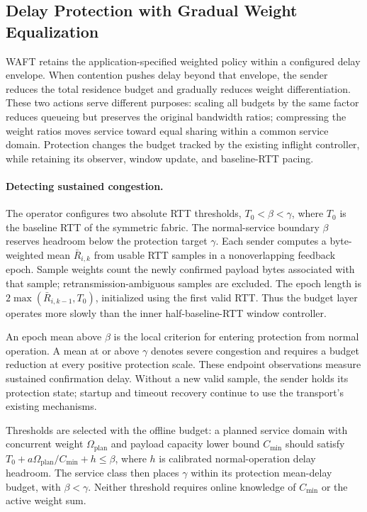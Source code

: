 \subsection{Delay Protection with Gradual Weight Equalization}
\label{sec:delay-protection}

WAFT retains the application-specified weighted policy within a configured delay
envelope. When contention pushes delay beyond that envelope, the sender reduces
the total residence budget and gradually reduces weight differentiation. These
two actions serve different purposes: scaling all budgets by the same factor
reduces queueing but preserves the original bandwidth ratios; compressing the
weight ratios moves service toward equal sharing within a common service domain.
Protection changes the budget tracked by the existing inflight controller,
while retaining its observer, window update, and baseline-RTT pacing.

\paragraph{Detecting sustained congestion.}
The operator configures two absolute RTT thresholds, $T_0<\beta<\gamma$,
where $T_0$ is the baseline RTT of the symmetric fabric. The normal-service
boundary $\beta$ reserves headroom below the protection target $\gamma$.
Each sender computes a byte-weighted mean $\bar R_{i,k}$ from usable RTT samples
in a nonoverlapping feedback epoch. Sample weights count the newly confirmed
payload bytes associated with that sample; retransmission-ambiguous samples are
excluded. The epoch length is $2\max(\bar R_{i,k-1},T_0)$, initialized using the
first valid RTT. Thus the budget layer operates more slowly than the inner
half-baseline-RTT window controller.

An epoch mean above $\beta$ is the local criterion for entering protection from
normal operation. A mean at or above $\gamma$ denotes severe congestion and
requires a budget reduction at every positive protection scale. These endpoint observations measure sustained confirmation delay. Without a new valid
sample, the sender holds its protection state; startup and timeout recovery
continue to use the transport's existing mechanisms.

Thresholds are selected with the offline budget: a planned service domain with
concurrent weight $\Omega_{\mathrm{plan}}$ and payload capacity lower bound
$C_{\min}$ should satisfy
$T_0+a\Omega_{\mathrm{plan}}/C_{\min}+h\le\beta$, where $h$ is calibrated
normal-operation delay headroom. The service class then places $\gamma$ within
its protection mean-delay budget, with $\beta<\gamma$. Neither threshold requires
online knowledge of $C_{\min}$ or the active weight sum.

